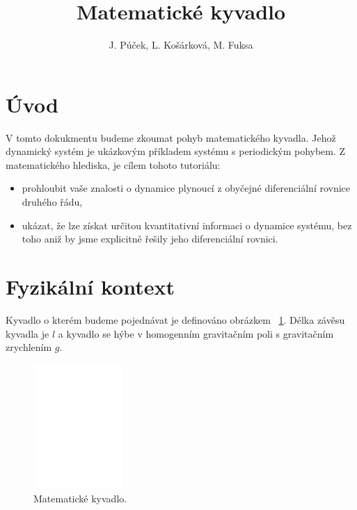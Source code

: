 \documentclass[reqno, a4paper]{amsart}
\author{J. Púček, L. Košárková, M. Fuksa}
\title{Matematické kyvadlo}
\begin{document}
\begin{abstract}
\end{abstract}

\maketitle

\tableofcontents

\section{Úvod}
\label{sec:Úvod}

V tomto dokukmentu budeme zkoumat pohyb matematického kyvadla. Jehož dynamický systém je ukázkovým příkladem systému s periodickým pohybem. Z matematického hlediska, je cílem tohoto tutoriálu:
\begin{itemize}
\item prohloubit vaše znalosti o dynamice plynoucí z obyčejné diferenciální rovnice druhého řádu,
\item ukázat, že lze získat určitou kvantitativní informaci o dynamice systému, bez toho aniž by jsme explicitně řešily jeho diferenciální rovnici.
\end{itemize}

\section{Fyzikální kontext}
\label{sec:Fyzikální kontext}
Kyvadlo o kterém budeme pojednávat je definováno obrázkem ~\ref{fig:pendulum-intro}. Délka závěsu kyvadla je $l$ a kyvadlo se hýbe v homogenním gravitačním poli s gravitačním zrychlením $g$.

\begin{figure}[h]
\centering
\includegraphics[width=0.3\textwidth]{pendulum-intro}
\caption{Matematické kyvadlo.}  
\label{fig:pendulum-intro}
\end{figure}
\end{document}
